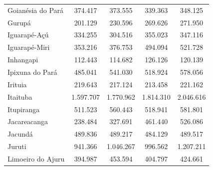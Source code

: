 \begin{table}[H]
{\begin{tabular}{l|c|c|c|c}
   Goianésia do Pará      & 374.417    &  373.555  & 339.363   & 348.125   \\
   Gurupá                 & 201.129    &  230.596  & 269.626   & 271.950   \\
   Iguarapé-Açú           & 334.255    &  304.516  & 355.023   & 347.116   \\
   Iguarapé-Miri          & 353.216    &  376.753  & 494.094   & 521.728   \\
   Inhangapi              & 112.443    &  114.682  & 126.126   & 120.139   \\
   Ipixuna do Pará        & 485.041    &  541.030  & 518.924   & 578.056   \\
   Irituia                & 219.643    &  217.124  & 213.458   & 221.162   \\
   Itaituba               & 1.597.707  & 1.770.962 & 1.814.310 & 2.046.616  \\
   Itupiranga             & 511.523    & 560.443   & 518.941   & 581.801   \\
   Jacareacanga           & 238.484    & 327.691   & 461.440   & 526.086   \\
   Jacundá                & 489.836    & 489.217   & 484.129   & 489.517   \\
   Juruti                 & 941.366    & 1.046.267 & 996.562   & 1.207.211   \\
   Limoeiro do Ajuru      & 394.987    & 453.594   & 404.797   & 424.661    \\
   \hline
\end{tabular}}
\end{table}

